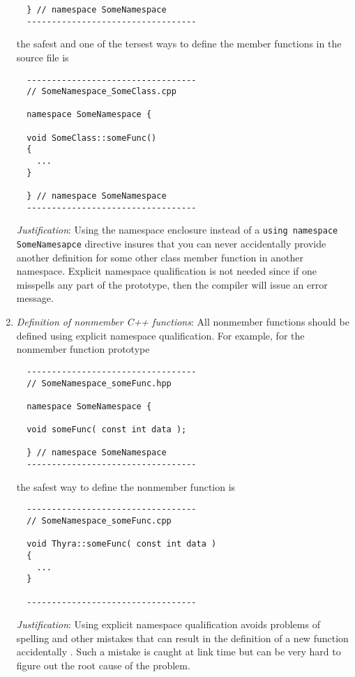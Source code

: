 \begin{enumerate}
{\begin{verbatim}
  } // namespace SomeNamespace
  ----------------------------------
\end{verbatim}}

the safest and one of the tersest ways to define the member functions in the
source file is

{\small\begin{verbatim}
  ----------------------------------
  // SomeNamespace_SomeClass.cpp

  namespace SomeNamespace {

  void SomeClass::someFunc()
  {
    ...
  }

  } // namespace SomeNamespace
  ----------------------------------
\end{verbatim}}

{}\textit{Justification}: Using the namespace enclosure instead of a
{}\texttt{using namespace SomeNamesapce} directive insures that you can never
accidentally provide another definition for some other class member function
in another namespace.  Explicit namespace qualification is not needed since if
one misspells any part of the prototype, then the compiler will issue an error
message.

{}\item\textit{Definition of nonmember C++ functions}: All nonmember
functions should be defined using explicit namespace qualification.  For
example, for the nonmember function prototype

{\small\begin{verbatim}
  ----------------------------------
  // SomeNamespace_someFunc.hpp

  namespace SomeNamespace {

  void someFunc( const int data );

  } // namespace SomeNamespace
  ----------------------------------
\end{verbatim}}

the safest way to define the nonmember function is

{\small\begin{verbatim}
  ----------------------------------
  // SomeNamespace_someFunc.cpp

  void Thyra::someFunc( const int data )
  {
    ...
  }

  ----------------------------------
\end{verbatim}}

{}\textit{Justification}: Using explicit namespace qualification avoids
problems of spelling and other mistakes that can result in the definition of a
new function accidentally {}\cite[Section 8.2]{stroustrup00}.  Such a mistake
is caught at link time but can be very hard to figure out the root cause of
the problem.


\end{enumerate}
